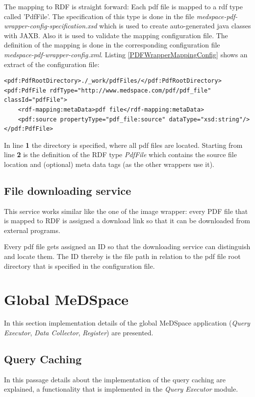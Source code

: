The mapping to RDF is straight forward: Each pdf file is mapped to a rdf type called 'PdfFile'. The specification of this type is done in the file \emph{medspace-pdf-wrapper-config-specification.xsd} which is used to create auto-generated java classes with JAXB. Also it is used to validate the mapping configuration file. The definition of the mapping is done in the corresponding configuration file \emph{medspace-pdf-wrapper-config.xml}. Listing \ref{PDFWrapperMappingConfig} shows an extract of the configuration file:

\begin{lstlisting}[style=RdfCodeStyle, caption=Extract of the pdf wrapper configuration, label=PDFWrapperMappingConfig]
<pdf:PdfRootDirectory>./_work/pdfFiles/</pdf:PdfRootDirectory>
<pdf:PdfFile rdfType="http://www.medspace.com/pdf/pdf_file" classId="pdfFile">
	<rdf-mapping:metaData>pdf file</rdf-mapping:metaData>
    <pdf:source propertyType="pdf_file:source" dataType="xsd:string"/>
</pdf:PdfFile>
\end{lstlisting}

In line \textbf{1} the directory is specified, where all pdf files are located.
Starting from line \textbf{2} is the definition of the RDF type \emph{PdfFile} which contains the source file location and (optional) meta data tags (as the other wrappers use it).

\subsection{File downloading service}

This service works similar like the one of the image wrapper: every PDF file that is mapped to RDF is assigned a download link so that it can be downloaded from external programs.

Every pdf file gets assigned an ID so that the downloading service can distinguish and locate them. The ID thereby is the file path in relation to the pdf file root directory that is specified in the configuration file.

\section{Global MeDSpace}

In this section implementation details of the global MeDSpace application (\emph{Query Executor}, \emph{Data Collector}, \emph{Register}) are presented.


\subsection{Query Caching}
In this passage details about the implementation of the query caching are explained, a functionality that is implemented in the \emph{Query Executor} module.

